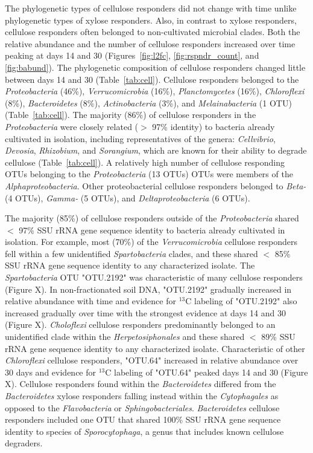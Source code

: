 The phylogenetic types of cellulose responders did not change with time unlike
phylogenetic types of xylose responders. Also, in
contrast to xylose responders, cellulose responders often belonged to
non-cultivated microbial clades. Both the relative abundance and the number of
cellulose responders increased over time peaking at days 14 and 30
(Figures~\ref{fig:l2fc}, \ref{fig:rspndr_count}, and \ref{fig:babund}). The
phylogenetic composition of cellulose responders changed little between days 14
and 30 (Table~\ref{tab:cell}). Cellulose responders belonged to the
\textit{Proteobacteria} (46\%), \textit{Verrucomicrobia} (16\%),
\textit{Planctomycetes} (16\%), \textit{Chloroflexi} (8\%),
\textit{Bacteroidetes} (8\%), \textit{Actinobacteria} (3\%), and
\textit{Melainabacteria} (1 OTU) (Table~\ref{tab:cell}). The majority (86\%) of
cellulose responders in the \textit{Proteobacteria} were closely related ($>$
97\% identity) to bacteria already cultivated in isolation, including
representatives of the genera: \textit{Cellvibrio}, \textit{Devosia},
\textit{Rhizobium}, and \textit{Sorangium}, which are known for their ability
to degrade cellulose (Table~\ref{tab:cell}). A relatively high number of
cellulose responding OTUs belonging to the \textit{Proteobacteria} (13 OTUs)
OTUs were members of the \textit{Alphaproteobacteria}. Other proteobacterial
cellulose responders belonged to \textit{Beta-} (4 OTUs), \textit{Gamma-} (5
OTUs), and \textit{Deltaproteobacteria} (6 OTUs). 

The majority (85\%) of cellulose responders outside of the
\textit{Proteobacteria} shared  $<$ 97\% SSU rRNA gene sequence identity to
bacteria already cultivated in isolation. For example, most (70\%) of the
\textit{Verrucomicrobia} cellulose responders fell within a few unidentified
\textit{Spartobacteria} clades, and these shared $<$ 85\% SSU rRNA gene
sequence identity to any characterized isolate. The \textit{Spartobacteria} OTU
"OTU.2192" was characteristic of many cellulose responders (Figure X). In
non-fractionated soil DNA, "OTU.2192" gradually increased in relative abundance
with time and evidence for $^{13}$C labeling of "OTU.2192" also increased
gradually over time with the strongest evidence at days 14 and 30 (Figure X).
\textit{Choloflexi} cellulose responders predominantly belonged to an
unidentified clade within the \textit{Herpetosiphonales} and these shared $<$
89\% SSU rRNA gene sequence identity to any characterized isolate.
Characteristic of other \textit{Chloroflexi} cellulose responders, "OTU.64"
increased in relative abundance over 30 days and evidence for $^{13}$C labeling
of "OTU.64" peaked days 14 and 30 (Figure X). Cellulose responders found within
the \textit{Bacteroidetes} differed from the \textit{Bacteroidetes} xylose
responders falling instead within the \textit{Cytophagales} as opposed to the
\textit{Flavobacteria} or \textit{Sphingobacteriales}. \textit{Bacteroidetes}
cellulose responders included one OTU that shared 100\% SSU rRNA gene sequence
identity to species of \textit{Sporocytophaga}, a genus that includes known
cellulose degraders.

